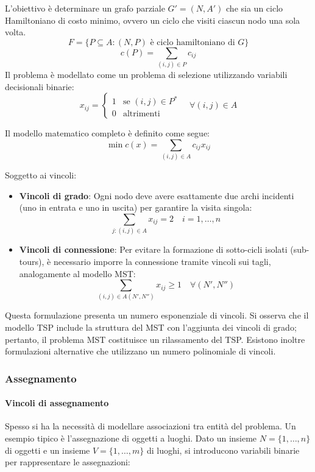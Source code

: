 \documentclass[12pt]{extarticle} %
\begin{document}
L'obiettivo è determinare un grafo parziale $G'=(N,A')$ che sia un ciclo Hamiltoniano di costo minimo, ovvero un ciclo che visiti ciascun nodo una sola volta.
\[
F = \{P\subseteq A:(N,P)\text{ è ciclo hamiltoniano di }G\}
\]
\[
c(P) = \sum_{(i,j)\in P} c_{ij}
\]
Il problema è modellato come un problema di selezione utilizzando variabili decisionali binarie:
\[
x_{ij} = \begin{cases} 
1 & \text{se } (i,j) \in P^* \\ 
0 & \text{altrimenti} 
\end{cases} \quad \forall (i,j) \in A
\]

\noindent Il modello matematico completo è definito come segue:
\[
\min c(x) = \sum_{(i,j) \in A} c_{ij}x_{ij}
\]

\noindent Soggetto ai vincoli:
\begin{itemize}
    \item \textbf{Vincoli di grado}: Ogni nodo deve avere esattamente due archi incidenti (uno in entrata e uno in uscita) per garantire la visita singola:
    \[ \sum_{j:(i,j) \in A} x_{ij} = 2 \quad i=1, \dots, n \]
    \item \textbf{Vincoli di connessione}: Per evitare la formazione di sotto-cicli isolati (sub-tours), è necessario imporre la connessione tramite vincoli sui tagli, analogamente al modello MST:
    \[ \sum_{(i,j) \in A(N', N'')} x_{ij} \ge 1 \quad \forall (N', N'') \]
\end{itemize}

Questa formulazione presenta un numero esponenziale di vincoli. Si osserva che il modello TSP include la struttura del MST con l'aggiunta dei vincoli di grado; pertanto, il problema MST costituisce un rilassamento del TSP. Esistono inoltre formulazioni alternative che utilizzano un numero polinomiale di vincoli.

\subsubsection{Assegnamento}

\paragraph{Vincoli di assegnamento}
Spesso si ha la necessità di modellare associazioni tra entità del problema. Un esempio tipico è l'assegnazione di oggetti a luoghi. Dato un insieme $N = \{1,\ldots,n\}$ di oggetti e un insieme $V = \{1,\ldots,m\}$ di luoghi, si introducono variabili binarie per rappresentare le assegnazioni:
\end{document}
